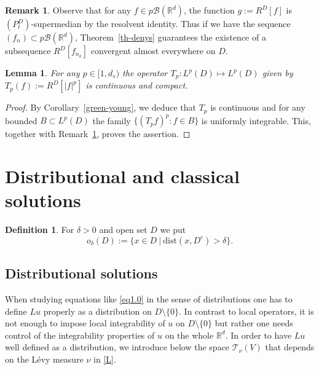 \documentclass[11pt,a4paper,reqno]{amsart}
\newtheorem{lemma}[theorem]{\bf Lemma}
\theoremstyle{definition}
\newtheorem{definition}[theorem]{Definition}
\newtheorem{remark}[theorem]{Remark}
\numberwithin{equation}{section}
\begin{document}
\begin{remark}
\label{rem.deny}
Observe that for any $f\in p\mathscr B(\mathbb R^d)$, the function $g:=R^D[f]$ is $(P^D_t)$-supermedian 
by the resolvent identity. Thus if we have the sequence $(f_n)\subset p\mathscr B(\mathbb R^d)$, 
Theorem~\ref{th-denys} guarantees the existence of a 
subsequence $R^D[f_{n_k}]$ convergent almost everywhere on $D$.
\end{remark}










\begin{lemma}
\label{green-l1}
For any $p\in [1,d_s)$ the operator $T_p: L^p(D)\mapsto L^p(D)$ given by $T_p(f):=R^D[|f|^p]$ is continuous and compact.
\end{lemma}
\begin{proof}
By Corollary~\ref{green-young}, we deduce that $T_p$ is continuous and 
for any bounded  $B\subset L^p(D)$  the family $\{(T_pf)^p: f\in B\}$ is uniformly integrable.
This, together with Remark~\ref{rem.deny},  proves the assertion. 
\end{proof}


\section{Distributional and classical  solutions}
\label{sec5}


\begin{definition}
For $\delta>0$ and open set $D$ we put
\[
o_\delta(D):=\{x\in D\ |\ \text{dist}(x,D^c)>\delta\}.
\]
\end{definition}

\subsection{Distributional solutions}

When studying   equations like   \eqref{eq1.0} in the sense of distributions 
one has to  define  $Lu$  properly as a distribution on $D\setminus\{0\}$.  
In contrast  to  local operators, it is not enough  to impose  local integrability of $u$ on $D\setminus\{0\}$
but rather one needs control of the integrability properties of $u$ on the whole $\mathbb R^d$. 
In order to have $Lu$ well defined as a distribution, we introduce below the space $\mathscr T_\nu(V)$
that depends on the L\'evy measure $\nu$ in \eqref{L}.
\end{document}
